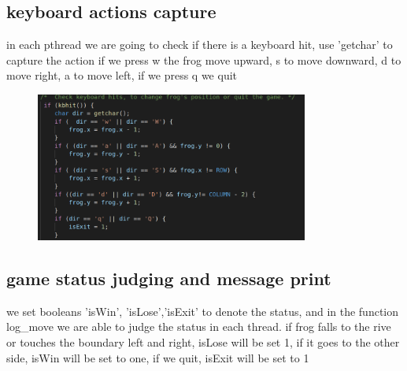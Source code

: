 \documentclass{article}
\begin{document}
\subsection{keyboard actions capture}
in each pthread we are going to check if there is a keyboard hit, use 'getchar' to capture the action
if we press w the frog move upward, s to move downward, d to move right, a to move left, if we press q we quit
\begin{figure}[htbp]
    \centering
    \includegraphics[width = 0.8\textwidth]{kb.png}
\end{figure}

\subsection{game status judging and message print}
we set booleans 'isWin', 'isLose','isExit' to denote the status, and in the function log\_move we are able to judge the status in each thread.
if frog falls to the rive or touches the boundary left and right, isLose will be set 1, if it goes to the other side, isWin will be set to one, if we quit, isExit will be set to 1
\end{document}
